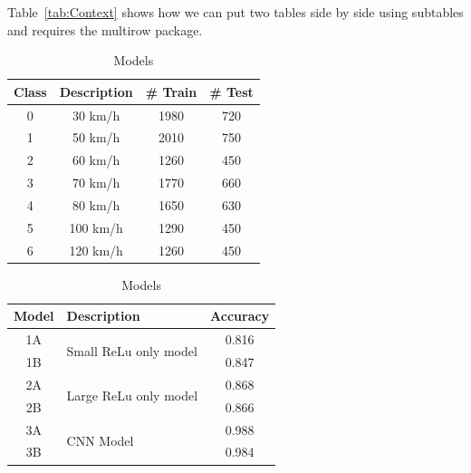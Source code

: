 \documentclass{article}
\begin{document}
Table~\ref{tab:Context} shows how we can put two tables side by side using subtables and requires the multirow package.


\begin{table}
  \centering
    \caption{German Speed Sign Classification: Data and Models\label{tab:Context}}
    
    \vspace*{-2mm}
    \begin{scriptsize}
    \begin{subtable}{.5\linewidth}
      \centering
        \caption{Data Sets\label{tab:cs1Data}}
    \sffamily
    \begin{tabular}{cccc}
    \toprule
         Class & Description & \# Train &\# Test  \\ \midrule
         0 & 30 km/h & 1980 & 720\\
         1 & 50 km/h & 2010 & 750\\
         2 & 60 km/h & 1260 & 450\\
         3 & 70 km/h & 1770 & 660\\
         4 & 80 km/h & 1650 & 630\\
         5 & 100 km/h & 1290 & 450\\
         6 & 120 km/h & 1260 & 450\\ \bottomrule
    \end{tabular}
    \end{subtable}%
    \begin{subtable}{.5\linewidth}
      \centering
        \caption{Models\label{tab:cs1Models}}
    \begin{tabular}{clc}
        \toprule
         Model &  Description & Accuracy\\ \midrule
         1A & \multirow{2}{*}{Small ReLu only model}  & 0.816\\ 
         1B &  & 0.847\\ \midrule
         2A & \multirow{2}{*}{Large ReLu only model}& 0.868\\ 
         2B && 0.866\\ \midrule
         3A & \multirow{2}{*}{CNN Model} & 0.988\\ 
         3B &  & 0.984\\ 
         \bottomrule
    \end{tabular}
    \end{subtable} 
    \end{scriptsize}
    
    \vspace*{-4mm}
\end{table}
\end{document}

